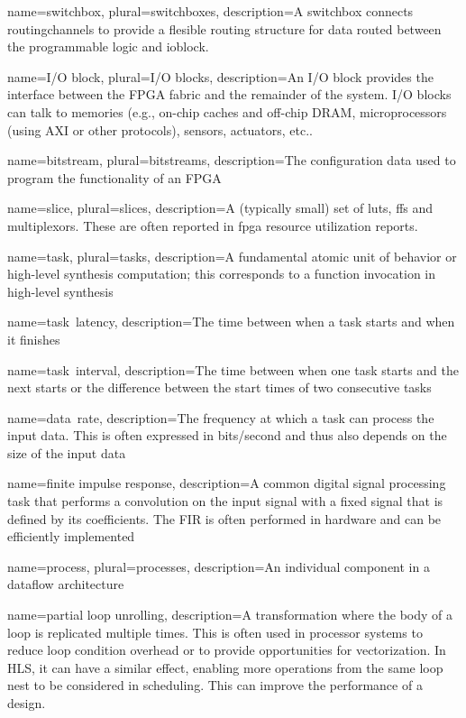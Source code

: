 {
	name={switchbox},
	plural={switchboxes},
	description={A switchbox connects \gls{routingchannel}s to provide a flesible routing structure for data routed between the programmable logic and \gls{ioblock}. }
}

{
	name={I/O block},
	plural={I/O blocks},
	description={An I/O block provides the interface between the FPGA fabric and the remainder of the system. I/O blocks can talk to memories (e.g., on-chip caches and off-chip DRAM, microprocessors (using AXI or other protocols), sensors, actuators, etc.. }
}


{
	name={bitstream},
	plural={bitstreams},
	description={The configuration data used to program the functionality of an FPGA}
}

{
	name={slice},
	plural={slices},
	description={A (typically small) set of \glspl{lut}, \glspl{ff} and multiplexors. These are often reported in \gls{fpga} resource utilization reports. }
}


{
	name={task},
	plural={tasks},
	description={A fundamental atomic unit of behavior or high-level synthesis computation; this corresponds to a function invocation in high-level synthesis}
}

{
	name={task~latency},
	description={The time between when a task starts and when it finishes}
}


{
	name={task~interval},
	description={The time between when one task starts and the next starts or the difference between the start times of two consecutive tasks}
}

{
	name={data~rate},
	description={The frequency at which a task can process the input data. This is often expressed in bits/second and thus also depends on the size of the input data}
}

{
	name={finite impulse response},
	description={A common digital signal processing task that performs a convolution on the input signal with a fixed signal that is defined by its coefficients. The FIR is often performed in hardware and can be efficiently implemented}
}

{
	name={process},
	plural={processes},
	description={An individual component in a dataflow architecture}
}

{
	name={partial loop unrolling},
	description={A transformation where the body of a loop is replicated multiple times.  This is often used in processor systems to reduce loop condition overhead or to provide opportunities for vectorization.  In HLS, it can have a similar effect, enabling more operations from the same loop nest to be considered in scheduling.  This can improve the performance of a design.}
}

